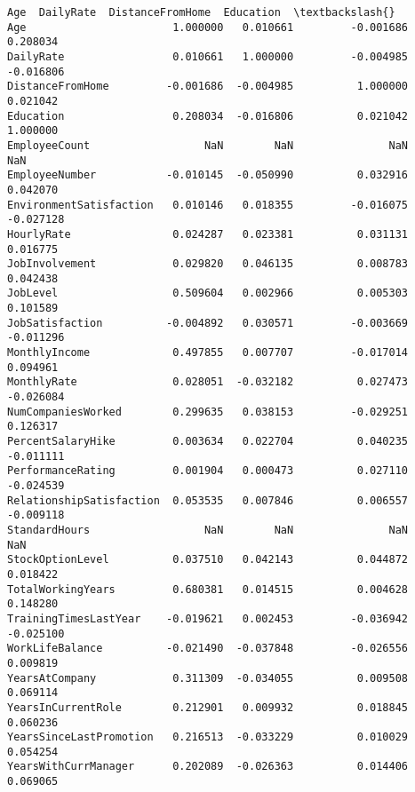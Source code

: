 \documentclass[11pt]{article}
\begin{document}
    
    \begin{Verbatim}[commandchars=\\\{\}]
                               Age  DailyRate  DistanceFromHome  Education  \textbackslash{}
Age                       1.000000   0.010661         -0.001686   0.208034   
DailyRate                 0.010661   1.000000         -0.004985  -0.016806   
DistanceFromHome         -0.001686  -0.004985          1.000000   0.021042   
Education                 0.208034  -0.016806          0.021042   1.000000   
EmployeeCount                  NaN        NaN               NaN        NaN   
EmployeeNumber           -0.010145  -0.050990          0.032916   0.042070   
EnvironmentSatisfaction   0.010146   0.018355         -0.016075  -0.027128   
HourlyRate                0.024287   0.023381          0.031131   0.016775   
JobInvolvement            0.029820   0.046135          0.008783   0.042438   
JobLevel                  0.509604   0.002966          0.005303   0.101589   
JobSatisfaction          -0.004892   0.030571         -0.003669  -0.011296   
MonthlyIncome             0.497855   0.007707         -0.017014   0.094961   
MonthlyRate               0.028051  -0.032182          0.027473  -0.026084   
NumCompaniesWorked        0.299635   0.038153         -0.029251   0.126317   
PercentSalaryHike         0.003634   0.022704          0.040235  -0.011111   
PerformanceRating         0.001904   0.000473          0.027110  -0.024539   
RelationshipSatisfaction  0.053535   0.007846          0.006557  -0.009118   
StandardHours                  NaN        NaN               NaN        NaN   
StockOptionLevel          0.037510   0.042143          0.044872   0.018422   
TotalWorkingYears         0.680381   0.014515          0.004628   0.148280   
TrainingTimesLastYear    -0.019621   0.002453         -0.036942  -0.025100   
WorkLifeBalance          -0.021490  -0.037848         -0.026556   0.009819   
YearsAtCompany            0.311309  -0.034055          0.009508   0.069114   
YearsInCurrentRole        0.212901   0.009932          0.018845   0.060236   
YearsSinceLastPromotion   0.216513  -0.033229          0.010029   0.054254   
YearsWithCurrManager      0.202089  -0.026363          0.014406   0.069065   


\end{Verbatim}
\end{document}
